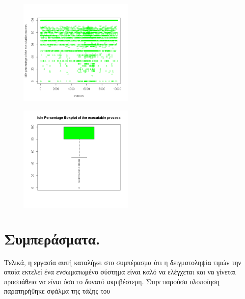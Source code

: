 \documentclass[12pt, a4paper]{article}
\begin{document}
\begin{figure}[H]
    \caption{}
    \centering
    \includegraphics[width=0.5\textwidth]{images/idle.png}
\end{figure}


\begin{figure}[H]
    \caption{}
    \centering
    \includegraphics[width=0.5\textwidth]{images/idle_boxpplot.png}
\end{figure}


\section{Συμπεράσματα.}
Τελικά, η εργασία αυτή καταλήγει στο συμπέρασμα ότι η δειγματοληψία τιμών την οποία εκτελεί ένα ενσωματωμένο σύστημα είναι καλό να ελέγχεται και να γίνεται προσπάθεια να είναι όσο το δυνατό ακριβέστερη. Στην παρούσα υλοποίηση παρατηρήθηκε σφάλμα της τάξης του 


\end{document}
